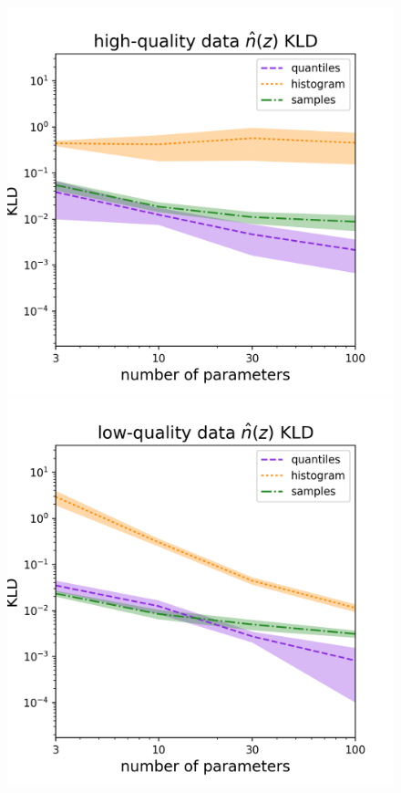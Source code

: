 \documentclass[\docopts]{\docclass}
\begin{document}
\begin{figure}
  \begin{center}
    \includegraphics[width=\columnwidth]{figures/graham_kld.png}\\
    \includegraphics[width=\columnwidth]{figures/schmidt_kld.png}

\end{center}
\end{figure}
\end{document}
